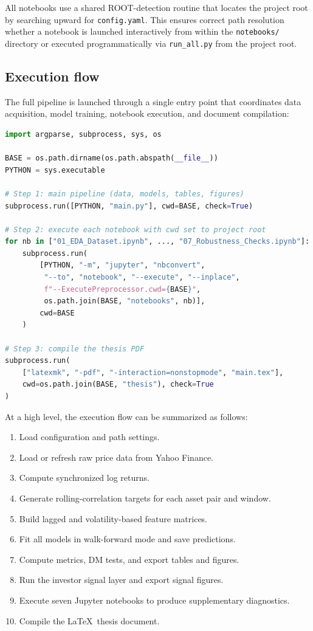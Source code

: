 All notebooks use a shared ROOT-detection routine that locates the project root by searching upward for \texttt{config.yaml}. This ensures correct path resolution whether a notebook is launched interactively from within the \texttt{notebooks/} directory or executed programmatically via \texttt{run\_all.py} from the project root.

\subsection{Execution flow}

The full pipeline is launched through a single entry point that coordinates data acquisition, model training, notebook execution, and document compilation:

\begin{lstlisting}[language=Python, caption={Automated full-pipeline runner (\texttt{run\_all.py}), simplified for readability.}, label=lst:runall]
import argparse, subprocess, sys, os

BASE = os.path.dirname(os.path.abspath(__file__))
PYTHON = sys.executable

# Step 1: main pipeline (data, models, tables, figures)
subprocess.run([PYTHON, "main.py"], cwd=BASE, check=True)

# Step 2: execute each notebook with cwd set to project root
for nb in ["01_EDA_Dataset.ipynb", ..., "07_Robustness_Checks.ipynb"]:
    subprocess.run(
        [PYTHON, "-m", "jupyter", "nbconvert",
         "--to", "notebook", "--execute", "--inplace",
         f"--ExecutePreprocessor.cwd={BASE}",
         os.path.join(BASE, "notebooks", nb)],
        cwd=BASE
    )

# Step 3: compile the thesis PDF
subprocess.run(
    ["latexmk", "-pdf", "-interaction=nonstopmode", "main.tex"],
    cwd=os.path.join(BASE, "thesis"), check=True
)
\end{lstlisting}

At a high level, the execution flow can be summarized as follows:

\begin{enumerate}
    \item Load configuration and path settings.
    \item Load or refresh raw price data from Yahoo Finance.
    \item Compute synchronized log returns.
    \item Generate rolling-correlation targets for each asset pair and window.
    \item Build lagged and volatility-based feature matrices.
    \item Fit all models in walk-forward mode and save predictions.
    \item Compute metrics, DM tests, and export tables and figures.
    \item Run the investor signal layer and export signal figures.
    \item Execute seven Jupyter notebooks to produce supplementary diagnostics.
    \item Compile the \LaTeX\ thesis document.
\end{enumerate}

